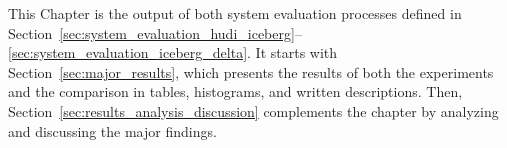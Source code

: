 This Chapter is the output of both system evaluation processes defined in Section~\ref{sec:system_evaluation_hudi_iceberg}--\ref{sec:system_evaluation_iceberg_delta}. It starts with Section~\ref{sec:major_results}, which presents the results of both the experiments and the comparison in tables, histograms, and written descriptions. Then, Section~\ref{sec:results_analysis_discussion} complements the chapter by analyzing and discussing the major findings.